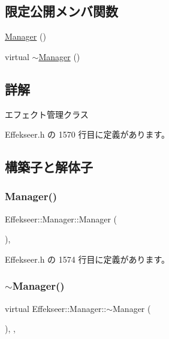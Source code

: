 \subsection*{限定公開メンバ関数}
\begin{DoxyCompactItemize}
\item 
\mbox{\hyperlink{class_effekseer_1_1_manager_a95f452d6946c93cece08532dc73e8fa2}{Manager}} ()
\item 
virtual \mbox{\hyperlink{class_effekseer_1_1_manager_af620a54ced00bb2d9f7b7d919e89fc98}{$\sim$\+Manager}} ()
\end{DoxyCompactItemize}


\subsection{詳解}
エフェクト管理クラス 

 Effekseer.\+h の 1570 行目に定義があります。



\subsection{構築子と解体子}
\mbox{\label{class_effekseer_1_1_manager_a95f452d6946c93cece08532dc73e8fa2}} 
\subsubsection{\texorpdfstring{Manager()}{Manager()}}
{\footnotesize\ttfamily Effekseer\+::\+Manager\+::\+Manager (\begin{DoxyParamCaption}{ }\end{DoxyParamCaption})\hspace{0.3cm}{\ttfamily [inline]}, {\ttfamily [protected]}}



 Effekseer.\+h の 1574 行目に定義があります。

\mbox{\label{class_effekseer_1_1_manager_af620a54ced00bb2d9f7b7d919e89fc98}} 
\subsubsection{\texorpdfstring{$\sim$\+Manager()}{~Manager()}}
{\footnotesize\ttfamily virtual Effekseer\+::\+Manager\+::$\sim$\+Manager (\begin{DoxyParamCaption}{ }\end{DoxyParamCaption})\hspace{0.3cm}{\ttfamily [inline]}, {\ttfamily [protected]}, {\ttfamily [virtual]}}



